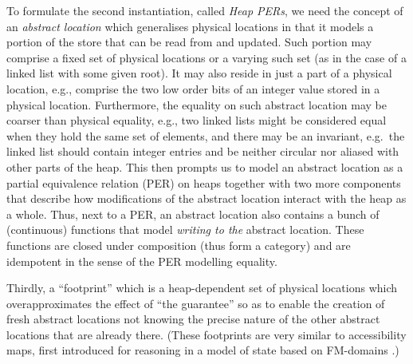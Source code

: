 \documentclass[orivec]{llncs}
\makeatletter
\newif\iffull\fullfalse
\renewcommand\subsection{\@startsection{subsection}{2}{\z@}{-2\p@ \@plus -4\p@ \@minus -4\p@}{-0.5em \@plus -0.22em \@minus -0.1em}{\normalfont\normalsize\bfseries}}
\makeatother
\begin{document}
\subsection{Abstract locations}
To formulate the \iffull third \else second \fi instantiation, called
\emph{Heap PERs}, we need the concept of an \emph{abstract location}
which generalises physical locations in that it models a portion of
the store that can be read from and updated. Such portion may comprise
a fixed set of physical locations or a varying such set (as in the
case of a linked list with some given root). It may also reside in
just a part of a physical location, e.g., comprise the two low order
bits of an integer value stored in a physical location. Furthermore,
the equality on such abstract location may be coarser than physical
equality, e.g., two linked lists might be considered equal when they
hold the same set of elements, and there may be an invariant, e.g.\
the linked list should contain integer entries and be neither circular
nor aliased with other parts of the heap. This then prompts us to
model an abstract location as a partial equivalence relation (PER) on
heaps together with two more components that describe how
modifications of the abstract location interact with the heap as a
whole. Thus, next to a PER, an abstract location also contains a bunch
of (continuous) functions that model \emph{writing to the} abstract
location. These functions are closed under composition (thus form a
category) and are idempotent in the sense of the PER modelling
equality.

Thirdly, a ``footprint'' which is a heap-dependent set of
physical locations which overapproximates the effect of ``the
guarantee'' so as to enable the creation of fresh abstract locations
not knowing the precise nature of the other abstract locations that
are already there. (These footprints are very similar to
accessibility maps, first introduced for reasoning in a model of state based on FM-domains \cite{DBLP:conf/tlca/BentonL05}.)
\end{document}
